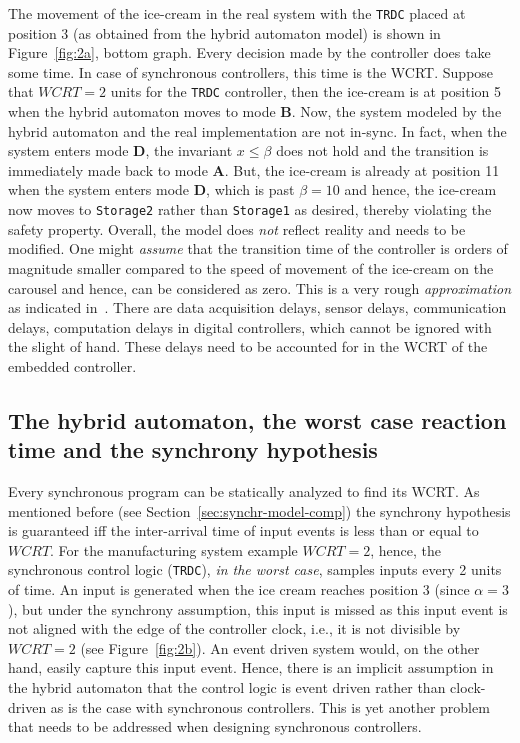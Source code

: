 \documentclass[10pt,journal,cspaper,compsoc]{IEEEtran}
\begin{document}
The movement of the ice-cream in the real system with the \texttt{TRDC}
placed at position 3 (as obtained from the hybrid automaton model) is
shown in Figure~\ref{fig:2a}, bottom graph. Every decision made by the
controller does take some time. In case of synchronous controllers, this
time is the WCRT. Suppose that $WCRT = 2$ units for the \texttt{TRDC}
controller, then the ice-cream is at position 5 when the hybrid
automaton moves to mode \textbf{B}. Now, the system modeled by the
hybrid automaton and the real implementation are not in-sync. In fact,
when the system enters mode \textbf{D}, the invariant $x \leq \beta$
does not hold and the transition is immediately made back to mode
\textbf{A}. But, the ice-cream is already at position 11 when the system
enters mode \textbf{D}, which is past $\beta = 10$ and hence, the
ice-cream now moves to \texttt{Storage2} rather than \texttt{Storage1}
as desired, thereby violating the safety property. Overall, the model
does \textit{not} reflect reality and needs to be modified. One might
\textit{assume} that the transition time of the controller is orders of
magnitude smaller compared to the speed of movement of the ice-cream on
the carousel and hence, can be considered as zero. This is a very rough
\textit{approximation} as indicated
in~\cite{albert2004comparison}. There are data acquisition delays,
sensor delays, communication delays, computation delays in digital
controllers, which cannot be ignored with the slight of hand. These
delays need to be accounted for in the WCRT of the embedded controller.



\subsection{The hybrid automaton, the worst case reaction time and the
  synchrony hypothesis}
\label{sec:hybrid-model-worst-1}

Every synchronous program can be statically analyzed to find its
WCRT. As mentioned before (see Section~\ref{sec:synchr-model-comp}) the
synchrony hypothesis is guaranteed \textrm{iff} the inter-arrival time
of input events is less than or equal to $WCRT$. For the manufacturing
system example $WCRT = 2$, hence, the synchronous control logic
(\texttt{TRDC}), \textit{in the worst case}, samples inputs every 2
units of time. An input is generated when the ice cream reaches position
3 (since $\alpha = 3$), but under the synchrony assumption, this input
is missed as this input event is not aligned with the edge of the
controller clock, i.e., it is not divisible by $WCRT=2$ (see
Figure~\ref{fig:2b}). An event driven system would, on the other hand,
easily capture this input event. Hence, there is an implicit assumption
in the hybrid automaton that the control logic is event driven rather
than clock-driven as is the case with synchronous controllers. This is
yet another problem that needs to be addressed when designing
synchronous controllers.
\end{document}
